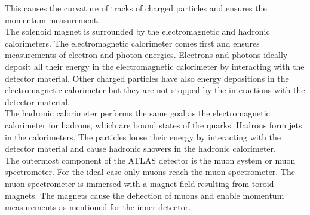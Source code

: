 This causes the curvature of tracks of charged particles and ensures the momentum measurement.\\
The solenoid magnet is surrounded by the electromagnetic and hadronic calorimeters.
The electromagnetic calorimeter comes first and ensures measurements of electron and photon energies.
Electrons and photons ideally deposit all their energy in the electromagnetic calorimeter by interacting with the detector material.
Other charged particles have also energy depositions in the electromagnetic calorimeter but they are not stopped by the interactions with the detector material. \\
The hadronic calorimeter performs the same goal as the electromagnetic calorimeter for hadrons, which are bound states of the quarks.
Hadrons form jets in the calorimeters.
The particles loose their energy by interacting with the detector material and cause hadronic showers in the hadronic calorimeter.\\
The outermost component of the ATLAS detector is the muon system or muon spectrometer.
For the ideal case only muons reach the muon spectrometer.
The muon spectrometer is immersed with a magnet field resulting from toroid magnets.
The magnets cause the deflection of muons and enable momentum measurements as mentioned for the inner detector.




